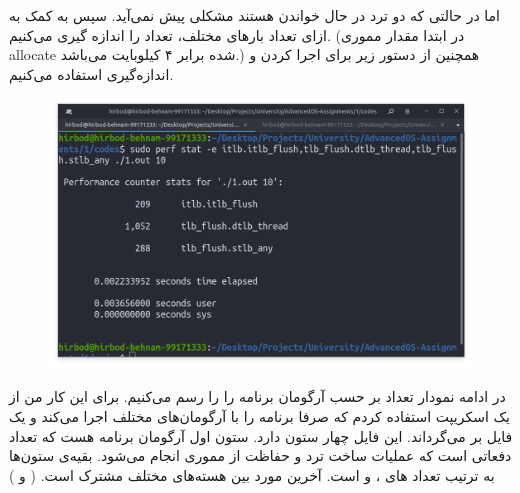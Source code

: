 اما در حالتی که دو ترد در حال خواندن هستند مشکلی پیش نمی‌آید.
سپس به کمک 
به ازای تعداد بار‌های مختلف،‌ تعداد
را اندازه گیری می‌کنیم.
(در ابتدا مقدار مموری allocate شده برابر ۴ کیلوبایت می‌باشد.)
همچنین از دستور زیر برای اجرا کردن و اندازه‌گیری
استفاده می‌کنیم.
\begin{figure}[H]
    \centering
    \includegraphics[scale=0.4]{pics/sample-run.png}
\end{figure}
در ادامه نمودار تعداد
بر حسب آرگومان برنامه را را رسم می‌کنیم.
برای این کار من از یک اسکریپت
استفاده کردم که صرفا برنامه را با آرگومان‌های مختلف اجرا می‌کند و یک فایل
بر می‌گرداند. این فایل چهار ستون دارد. ستون اول آرگومان برنامه هست که تعداد دفعاتی است که
عملیات ساخت ترد و حفاظت از مموری انجام می‌شود. بقیه‌ی ستون‌ها به ترتیب تعداد
های
،
 و
است. آخرین مورد بین هسته‌های مختلف مشترک است.
( و )

